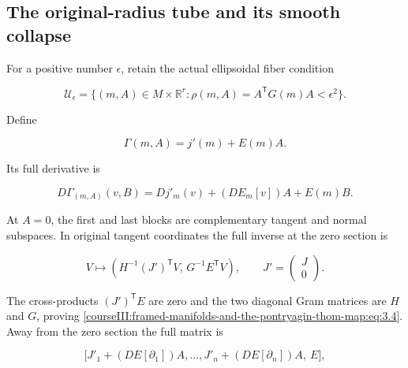 \label{courseIII:framed-manifolds-and-the-pontryagin-thom-map:pt-full-tube-and-collapse}

\subsection{The original-radius tube and its smooth collapse}
\label{courseIII:framed-manifolds-and-the-pontryagin-thom-map:section-3}

\label{courseIII:pontryagin-thom:3}

For a positive number \(\epsilon\), retain the actual ellipsoidal fiber condition

\begin{equation}
\mathcal U_\epsilon=
 \{(m,A)\in M\times\mathbb R^r:
                 \rho(m,A)=A^{\mathsf T}G(m)A<\epsilon^2\}.
 \label{courseIII:framed-manifolds-and-the-pontryagin-thom-map:eq:3.1}
\end{equation}

Define

\begin{equation}
\Gamma(m,A)=j'(m)+E(m)A.
 \label{courseIII:framed-manifolds-and-the-pontryagin-thom-map:eq:3.2}
\end{equation}

Its full derivative is

\begin{equation}
D\Gamma_{(m,A)}(v,B)
   =Dj'_m(v)+(DE_m[v])A+E(m)B.
 \label{courseIII:framed-manifolds-and-the-pontryagin-thom-map:eq:3.3}
\end{equation}

At \(A=0\), the first and last blocks are complementary tangent and normal subspaces. In original tangent coordinates the full inverse at the zero section is

\begin{equation}
V\longmapsto
 \left(H^{-1}(J')^{\mathsf T}V,\,
              G^{-1}E^{\mathsf T}V\right),
 \qquad J'=\begin{pmatrix}J\\0\end{pmatrix}.
 \label{courseIII:framed-manifolds-and-the-pontryagin-thom-map:eq:3.4}
\end{equation}

The cross-products \((J')^{\mathsf T}E\) are zero and the two diagonal Gram matrices are \(H\) and \(G\), proving \eqref{courseIII:framed-manifolds-and-the-pontryagin-thom-map:eq:3.4}. Away from the zero section the full matrix is

\begin{equation}
\bigl[J'_1+(DE[\partial_1])A,\ldots,
           J'_n+(DE[\partial_n])A,\ E\bigr],
 \label{courseIII:framed-manifolds-and-the-pontryagin-thom-map:eq:3.5}
\end{equation}

